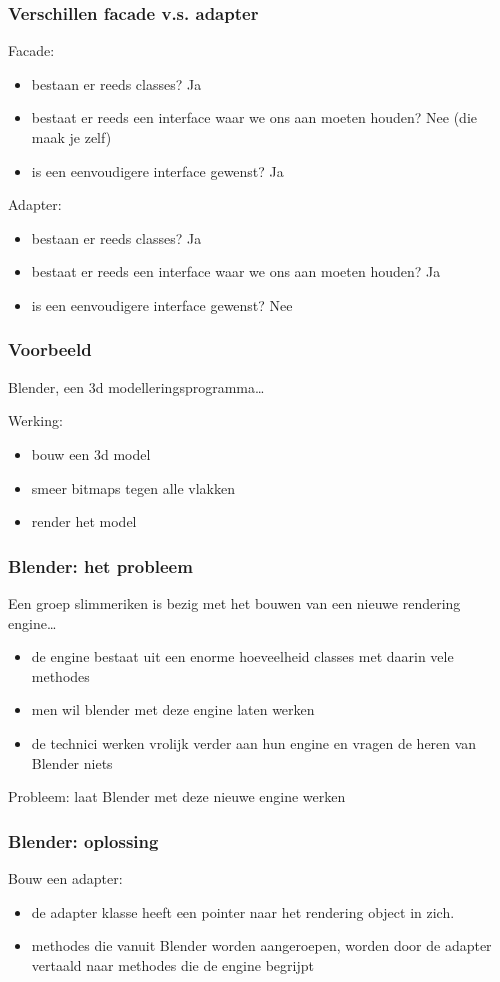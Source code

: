 \documentclass{beamer}
\begin{document}
\begin{frame} \frametitle{Verschillen facade v.s. adapter}
Facade:
\begin{itemize}
\item bestaan er reeds classes? Ja
\item bestaat er reeds een interface waar we ons aan moeten houden? Nee (die maak je zelf)
\item is een eenvoudigere interface gewenst? Ja
\end{itemize}
Adapter:
\begin{itemize}
\item bestaan er reeds classes? Ja
\item bestaat er reeds een interface waar we ons aan moeten houden? Ja
\item is een eenvoudigere interface gewenst? Nee
\end{itemize}
\end{frame}


\begin{frame}[fragile]\frametitle{Voorbeeld}
Blender, een 3d modelleringsprogramma\ldots

Werking:
\begin{itemize}
\item bouw een 3d model
\item smeer bitmaps tegen alle vlakken
\item render het model
\end{itemize}
\end{frame}



\begin{frame} \frametitle{Blender: het probleem}
  Een groep slimmeriken is bezig met het bouwen van een nieuwe rendering engine\ldots
  \begin{itemize}
  \item de engine bestaat uit een enorme hoeveelheid classes met daarin vele methodes
  \item men wil blender met deze engine laten werken
  \item de technici werken vrolijk verder aan hun engine en vragen de heren van Blender niets
  \end{itemize}
Probleem: laat Blender met deze nieuwe engine werken
\end{frame}

\begin{frame} \frametitle{Blender: oplossing}
  Bouw een adapter:
  \begin{itemize}
  \item de adapter klasse heeft een pointer naar het rendering object in zich.
  \item methodes die vanuit Blender worden aangeroepen, worden door de adapter vertaald naar methodes die de engine begrijpt
  \end{itemize}
\end{frame}
\end{document}
